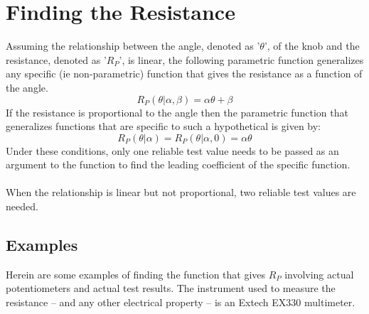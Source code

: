 \documentclass{article}
\begin{document}
	\section[Resistance]{Finding the Resistance}
	Assuming the relationship between the angle, denoted as '$\theta$', of the knob and the resistance, denoted as '$R_P$', is linear, the following parametric function generalizes any specific (ie non-parametric) function that gives the resistance as a function of the angle.
	$$ R_P(\theta \vert \alpha, \beta) = \alpha \theta +\beta$$
	If the resistance is proportional to the angle then the parametric function that generalizes functions that are specific to such a hypothetical is given by:
	$$ R_P(\theta \vert \alpha) = R_P(\theta \vert \alpha, 0) = \alpha \theta$$
	Under these conditions, only one reliable test value needs to be passed as an argument to the function to find the leading coefficient of the specific function. \\ \\
	When the relationship is linear but not proportional, two reliable test values are needed.
	\subsection{Examples}
	Herein are some examples of finding the function that gives $R_P$ involving actual potentiometers and actual test results.  The instrument used to measure the resistance -- and any other electrical property -- is an Extech EX330 multimeter.
\end{document}
